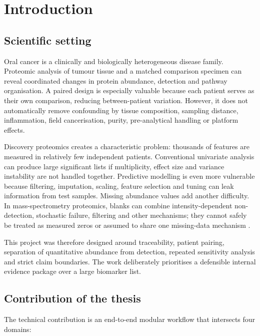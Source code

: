 \chapter{Introduction}
\label{chap:introduction}

\section{Scientific setting}
\label{sec:scientific_setting}

Oral cancer is a clinically and biologically heterogeneous disease family. Proteomic analysis of tumour tissue and a matched comparison specimen can reveal coordinated changes in protein abundance, detection and pathway organisation. A paired design is especially valuable because each patient serves as their own comparison, reducing between-patient variation. However, it does not automatically remove confounding by tissue composition, sampling distance, inflammation, field cancerisation, purity, pre-analytical handling or platform effects.

Discovery proteomics creates a characteristic \texttt{} problem: thousands of features are measured in relatively few independent patients. Conventional univariate analysis can produce large significant lists if multiplicity, effect size and variance instability are not handled together. Predictive modelling is even more vulnerable because filtering, imputation, scaling, feature selection and tuning can leak information from test samples. Missing abundance values add another difficulty. In mass-spectrometry proteomics, blanks can combine intensity-dependent non-detection, stochastic failure, filtering and other mechanisms; they cannot safely be treated as measured zeros or assumed to share one missing-data mechanism \parencite{webb2015,lazar2016,obrien2018,li2023}.

This project was therefore designed around traceability, patient pairing, separation of quantitative abundance from detection, repeated sensitivity analysis and strict claim boundaries. The work deliberately prioritises a defensible internal evidence package over a large biomarker list.

\section{Contribution of the thesis}
\label{sec:contribution_of_the_thesis}

The technical contribution is an end-to-end modular workflow that intersects four domains:

